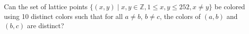Can the set of lattice points $\{(x, y) \mid x, y \in \mathbb{Z}, 1 \le x, y \le 252, x \neq y\}$ be colored using 10 distinct colors such that for all $a \neq b$, $b \neq c$, the colors of $(a, b)$ and $(b, c)$ are distinct?